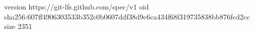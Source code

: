 version https://git-lfs.github.com/spec/v1
oid sha256:607ff4906303533b352c0b0607ddf38d9c6ca434f68f319735838bb876fcd2cc
size 2351
